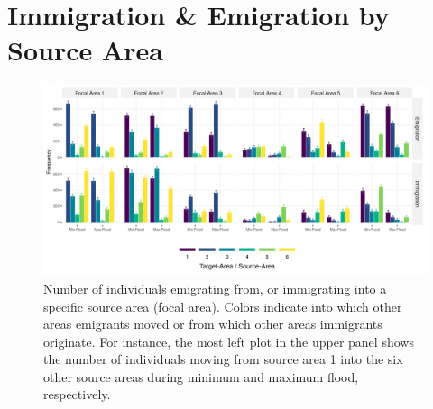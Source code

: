 \documentclass[abstract=on,10pt,a4paper,bibliography=totocnumbered]{article}
\begin{document}
\section{Immigration \& Emigration by Source Area}
\begin{figure}[htbp]
 \begin{center}
  \includegraphics[width = \textwidth]{Figures/ImmigrationEmigration.png}
  \caption{Number of individuals emigrating from, or immigrating into a specific
  source area (focal area). Colors indicate into which other areas emigrants
  moved or from which other areas immigrants originate. For instance, the most
  left plot in the upper panel shows the number of individuals moving from
  source area 1 into the six other source areas during minimum and maximum
  flood, respectively.}
  \label{EmigrationImmigration}
 \end{center}
\end{figure}

\newpage
\end{document}
